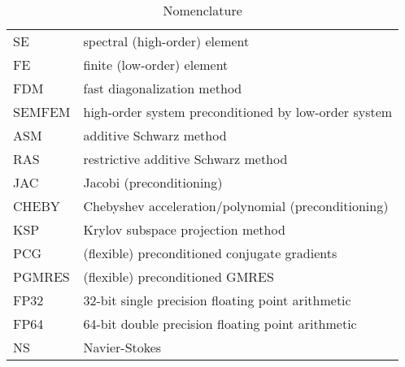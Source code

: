 \begin{table}
\centering
\begin{tabular}{l l}
\hline
SE & spectral (high-order) element \\
FE & finite (low-order) element \\
FDM & fast diagonalization method \\
SEMFEM & high-order system preconditioned by low-order system \\
ASM & additive Schwarz method \\
RAS & restrictive additive Schwarz method \\
JAC & Jacobi (preconditioning) \\
CHEBY & Chebyshev acceleration/polynomial (preconditioning) \\
KSP & Krylov subspace projection method\\
PCG & (flexible) preconditioned conjugate gradients \\
PGMRES & (flexible) preconditioned GMRES\\
FP32 & 32-bit single precision floating point arithmetic\\
FP64 & 64-bit double precision floating point arithmetic\\
NS & Navier-Stokes\\
\hline
\end{tabular}
\caption{
  Nomenclature
  \label{table:terms}
}
\end{table}
